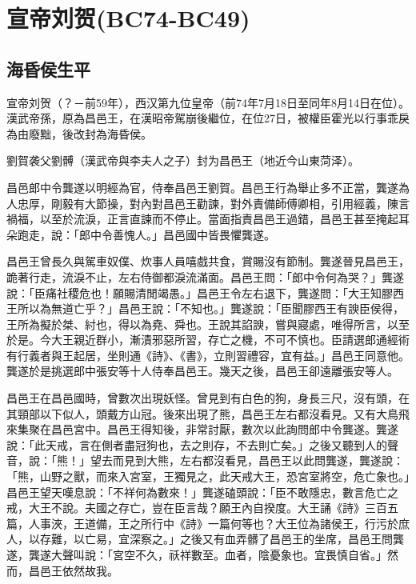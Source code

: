 
\section{宣帝刘贺\tiny(BC74-BC49)}

\subsection{海昏侯生平}

宣帝刘贺（？－前59年），西汉第九位皇帝（前74年7月18日至同年8月14日在位）。漢武帝孫，原為昌邑王，在漢昭帝駕崩後繼位，在位27日，被權臣霍光以行事乖戾為由廢黜，後改封為海昏侯。

劉賀袭父劉髆（漢武帝與李夫人之子）封为昌邑王（地近今山東菏泽）。

昌邑郎中令龔遂以明經為官，侍奉昌邑王劉賀。昌邑王行為舉止多不正當，龔遂為人忠厚，剛毅有大節操，對內對昌邑王勸諫，對外責備師傅卿相，引用經義，陳言禍福，以至於流淚，正言直諫而不停止。當面指責昌邑王過錯，昌邑王甚至掩起耳朵跑走，說：「郎中令善愧人。」昌邑國中皆畏懼龔遂。

昌邑王曾長久與駕車奴僕、炊事人員嘻戲共食，賞賜沒有節制。龔遂晉見昌邑王，跪著行走，流淚不止，左右侍御都淚流滿面。昌邑王問：「郎中令何為哭？」龔遂說：「臣痛社稷危也！願賜清閒竭愚。」昌邑王令左右退下，龔遂問：「大王知膠西王所以為無道亡乎？」昌邑王說：「不知也。」龔遂說：「臣聞膠西王有諛臣侯得，王所為擬於桀、紂也，得以為堯、舜也。王說其諂諛，嘗與寢處，唯得所言，以至於是。今大王親近群小，漸漬邪惡所習，存亡之機，不可不慎也。臣請選郎通經術有行義者與王起居，坐則通《詩》、《書》，立則習禮容，宜有益。」昌邑王同意他。龔遂於是挑選郎中張安等十人侍奉昌邑王。幾天之後，昌邑王卻遠離張安等人。

昌邑王在昌邑國時，曾數次出現妖怪。曾見到有白色的狗，身長三尺，沒有頭，在其頸部以下似人，頭戴方山冠。後來出現了熊，昌邑王左右都沒看見。又有大鳥飛來集聚在昌邑宮中。昌邑王得知後，非常討厭，數次以此詢問郎中令龔遂。龔遂說：「此天戒，言在側者盡冠狗也，去之則存，不去則亡矣。」之後又聽到人的聲音，說：「熊！」望去而見到大熊，左右都沒看見，昌邑王以此問龔遂，龔遂說：「熊，山野之獸，而來入宮室，王獨見之，此天戒大王，恐宮室將空，危亡象也。」昌邑王望天嘆息說：「不祥何為數來！」龔遂磕頭說：「臣不敢隱忠，數言危亡之戒，大王不說。夫國之存亡，豈在臣言哉？願王內自揆度。大王誦《詩》三百五篇，人事浹，王道備，王之所行中《詩》一篇何等也？大王位為諸侯王，行污於庶人，以存難，以亡易，宜深察之。」之後又有血弄髒了昌邑王的坐席，昌邑王問龔遂，龔遂大聲叫說：「宮空不久，祅祥數至。血者，陰憂象也。宜畏慎自省。」然而，昌邑王依然故我。


